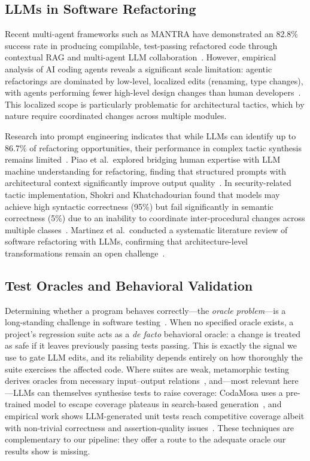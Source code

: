 \documentclass[runningheads]{llncs}
\begin{document}
\subsection{LLMs in Software Refactoring}
Recent multi-agent frameworks such as MANTRA have demonstrated an 82.8\% success rate in producing compilable, test-passing refactored code through contextual RAG and multi-agent LLM collaboration~\cite{xu2025mantra}. However, empirical analysis of AI coding agents reveals a significant scale limitation: agentic refactorings are dominated by low-level, localized edits (renaming, type changes), with agents performing fewer high-level design changes than human developers~\cite{horikawa2025agentic}. This localized scope is particularly problematic for architectural tactics, which by nature require coordinated changes across multiple modules.

Research into prompt engineering indicates that while LLMs can identify up to 86.7\% of refactoring opportunities, their performance in complex tactic synthesis remains limited~\cite{liu2025exploring}. Piao et al.\ explored bridging human expertise with LLM machine understanding for refactoring, finding that structured prompts with architectural context significantly improve output quality~\cite{piao2025refactoring}. In security-related tactic implementation, Shokri and Khatchadourian found that models may achieve high syntactic correctness (95\%) but fail significantly in semantic correctness (5\%) due to an inability to coordinate inter-procedural changes across multiple classes~\cite{shokri2024ipsynth}. Martinez et al.\ conducted a systematic literature review of software refactoring with LLMs, confirming that architecture-level transformations remain an open challenge~\cite{martinez2025refactoring}.

\subsection{Test Oracles and Behavioral Validation}
Determining whether a program behaves correctly---the \emph{oracle problem}---is a long-standing challenge in software testing~\cite{barr2015oracle}. When no specified oracle exists, a project's regression suite acts as a \emph{de facto} behavioral oracle: a change is treated as safe if it leaves previously passing tests passing. This is exactly the signal we use to gate LLM edits, and its reliability depends entirely on how thoroughly the suite exercises the affected code. Where suites are weak, metamorphic testing derives oracles from necessary input--output relations~\cite{chen2018metamorphic}, and---most relevant here---LLMs can themselves synthesise tests to raise coverage: CodaMosa uses a pre-trained model to escape coverage plateaus in search-based generation~\cite{lemieux2023codamosa}, and empirical work shows LLM-generated unit tests reach competitive coverage albeit with non-trivial correctness and assertion-quality issues~\cite{schafer2024llmtest}. These techniques are complementary to our pipeline: they offer a route to the adequate oracle our results show is missing.
\end{document}
